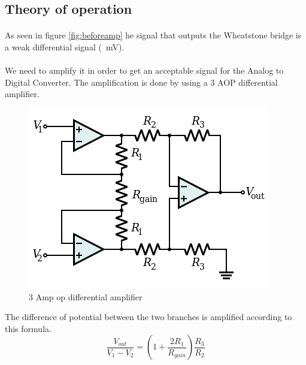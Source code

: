\documentclass{article}[12pt]
\begin{document}
\subsection{Theory of operation}
\paragraph{}
As seen in figure \ref{fig:beforeamp} he signal that outputs the Wheatstone bridge is a weak differential signal (~mV).
\paragraph{}
We need to amplify it in order to get an acceptable signal for the Analog to Digital Converter.
The amplification is done by using a 3 AOP differential amplifier.
\begin{figure}[H]
    \centering
    \includegraphics[width = .4\textwidth]{figures/3AOP_differential_amplifier.png}
    \caption{3 Amp op differential amplifier}
    \label{fig:3OpAmp}
\end{figure}
The difference of potential between the two branches is amplified according to this formula.
\begin{equation}
    \dfrac{V_{out}}{V_1-V_2}=(1+\dfrac{2R_1}{R_{gain}})\dfrac{R_3}{R_2}
\end{equation}
\end{document}
